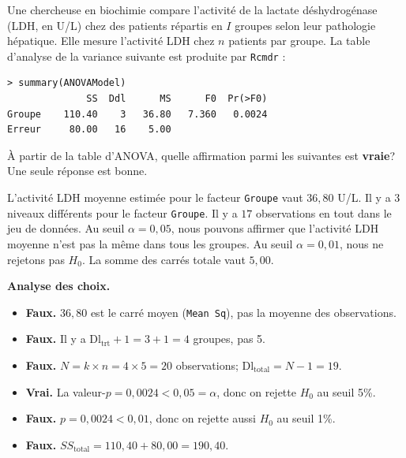 \documentclass{Evaluation}
\begin{document}
\begin{questions}


\question
Une chercheuse en biochimie compare l'activité de la lactate déshydrogénase (LDH, en U/L)
chez des patients répartis en $I$ groupes selon leur pathologie hépatique.
Elle mesure l'activité LDH chez $n$ patients par groupe.
La table d'analyse de la variance suivante est produite par \texttt{Rcmdr} :

\begin{verbatim}
> summary(ANOVAModel)
              SS  Ddl      MS      F0  Pr(>F0)
Groupe    110.40    3   36.80   7.360   0.0024
Erreur     80.00   16    5.00
\end{verbatim}

À partir de la table d'ANOVA, quelle affirmation parmi les suivantes est \textbf{vraie}?
Une seule réponse est bonne.

\begin{checkboxes}
    \choice L'activité LDH moyenne estimée pour le facteur \texttt{Groupe} vaut $36{,}80$ U/L.
    \choice Il y a $3$ niveaux différents pour le facteur \texttt{Groupe}.
    \choice Il y a $17$ observations en tout dans le jeu de données.
    \correctchoice Au seuil $\alpha=0{,}05$, nous pouvons affirmer que l'activité LDH moyenne n'est pas la même dans tous les groupes.
    \choice Au seuil $\alpha=0{,}01$, nous ne rejetons pas $H_0$.
    \choice La somme des carrés totale vaut $5{,}00$.
\end{checkboxes}

\begin{solution}
\textbf{Analyse des choix.}
\begin{itemize}
    \item \textbf{Faux.} $36{,}80$ est le carré moyen (\texttt{Mean Sq}), pas la moyenne des observations.
    \item \textbf{Faux.} Il y a $\text{Dl}_{\text{trt}}+1=3+1=4$ groupes, pas 5.
    \item \textbf{Faux.} $N=k\times n=4\times 5=20$ observations; $\text{Dl}_\text{total}=N-1=19$.
    \item \textbf{Vrai.} La valeur-$p=0{,}0024<0{,}05=\alpha$, donc on rejette $H_0$ au seuil 5\%.
    \item \textbf{Faux.} $p=0{,}0024<0{,}01$, donc on rejette aussi $H_0$ au seuil 1\%.
    \item \textbf{Faux.} $SS_\text{total}=110{,}40+80{,}00=190{,}40$.
\end{itemize}
\end{solution}


\end{questions}
\end{document}
